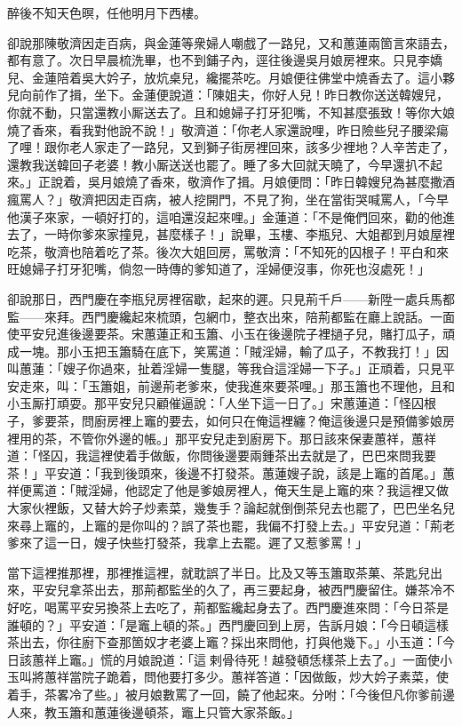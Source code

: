 \begin{myquote} 
醉後不知天色暝，任他明月下西樓。
\end{myquote} 

卻說那陳敬濟因走百病，與金蓮等衆婦人嘲戲了一路兒，又和蕙蓮兩箇言來語去，都有意了。次日早晨梳洗畢，也不到鋪子內，逕往後邊吳月娘房裡來。只見李嬌兒、金蓮陪着吳大妗子，放炕桌兒，纔擺茶吃。月娘便往佛堂中燒香去了。這小夥兒向前作了揖，坐下。金蓮便說道：「陳姐夫，你好人兒！昨日教你送送韓嫂兒，你就不動，只當還教小厮送去了。且和媳婦子打牙犯嘴，不知甚麼張致！{}等你大娘燒了香來，看我對他說不說！」敬濟道：「你老人家還說哩，昨日險些兒子腰梁瘍了哩！跟你老人家走了一路兒，又到獅子街房裡回來，該多少裡地？人辛苦走了，還教我送韓回子老婆！教小厮送送也罷了。睡了多大回就天曉了，今早還扒不起來。」正說着，吳月娘燒了香來，敬濟作了揖。月娘便問：「昨日韓嫂兒為甚麼撒酒瘋罵人？」敬濟把因走百病，被人挖開門，不見了狗，坐在當街哭喊罵人，「今早他漢子來家，一頓好打的，{}這咱還沒起來哩。」金蓮道：「不是俺們回來，勸的他進去了，一時你爹來家撞見，甚麼樣子！」說畢，玉樓、李瓶兒、大姐都到月娘屋裡吃茶，敬濟也陪着吃了茶。後次大姐回房，罵敬濟：「不知死的囚根子！平白和來旺媳婦子打牙犯嘴，倘忽一時傳的爹知道了，淫婦便沒事，{}{}你死也沒處死！」

卻說那日，西門慶在李瓶兒房裡宿歇，起來的遲。只見荊千戶——新陞一處兵馬都監——來拜。西門慶纔起來梳頭，包網巾，整衣出來，陪荊都監在廳上說話。一面使平安兒進後邊要茶。宋蕙蓮正和玉簫、小玉在後邊院子裡撾子兒，賭打瓜子，頑成一塊。那小玉把玉簫騎在底下，笑罵道：「賊淫婦，輸了瓜子，不教我打！」因叫蕙蓮：「嫂子你過來，扯着淫婦一隻腿，等我㒲這淫婦一下子。」{}正頑着，只見平安走來，叫：「玉簫姐，前邊荊老爹來，使我進來要茶哩。」那玉簫也不理他，且和小玉厮打頑耍。那平安兒只顧催逼說：「人坐下這一日了。」宋蕙蓮道：「怪囚根子，爹要茶，問廚房裡上竈的要去，如何只在俺這裡纏？俺這後邊只是預備爹娘房裡用的茶，不管你外邊的帳。」那平安兒走到廚房下。那日該來保妻蕙祥，蕙祥道：「怪囚，我這裡使着手做飯，你問後邊要兩鍾茶出去就是了，巴巴來問我要茶！」平安道：「我到後頭來，後邊不打發茶。蕙蓮嫂子說，該是上竈的首尾。」蕙祥便罵道：「賊淫婦，他認定了他是爹娘房裡人，{}俺天生是上竈的來？我這裡又做大家伙裡飯，又替大妗子炒素菜，幾隻手？論起就倒倒茶兒去也罷了，巴巴坐名兒來尋上竈的，上竈的是你叫的？{}誤了茶也罷，我偏不打發上去。」平安兒道：「荊老爹來了這一日，嫂子快些打發茶，我拿上去罷。遲了又惹爹罵！」

當下這裡推那裡，那裡推這裡，就耽誤了半日。比及又等玉簫取茶菓、茶匙兒出來，平安兒拿茶出去，那荊都監坐的久了，再三要起身，被西門慶留住。嫌茶冷不好吃，喝罵平安另換茶上去吃了，荊都監纔起身去了。西門慶進來問：「今日茶是誰頓的？」平安道：「是竈上頓的茶。」西門慶回到上房，告訴月娘：「今日頓這樣茶出去，你往廚下查那箇奴才老婆上竈？採出來問他，打與他幾下。」小玉道：「今日該蕙祥上竈。」慌的月娘說道：「這𢱉剌骨待死！越發頓恁樣茶上去了。」一面使小玉叫將蕙祥當院子跪着，問他要打多少。蕙祥答道：「因做飯，炒大妗子素菜，使着手，茶畧冷了些。」被月娘數罵了一回，饒了他起來。分咐：「今後但凡你爹前邊人來，教玉簫和蕙蓮後邊頓茶，竈上只管大家茶飯。」

